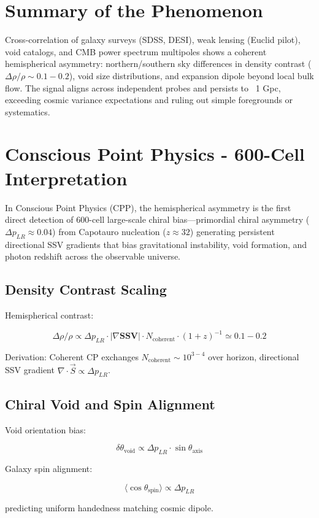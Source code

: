 \documentclass[11pt]{article}
\begin{document}
\section{Summary of the Phenomenon}
Cross-correlation of galaxy surveys (SDSS, DESI), weak lensing (Euclid pilot), void catalogs, and CMB power spectrum multipoles shows a coherent hemispherical asymmetry: northern/southern sky differences in density contrast ($\Delta \rho/\rho \sim 0.1-0.2$), void size distributions, and expansion dipole beyond local bulk flow. The signal aligns across independent probes and persists to ~1 Gpc, exceeding cosmic variance expectations and ruling out simple foregrounds or systematics.

\section{Conscious Point Physics - 600-Cell Interpretation}
In Conscious Point Physics (CPP), the hemispherical asymmetry is the first direct detection of 600-cell large-scale chiral bias—primordial chiral asymmetry ($\Delta p_{LR} \approx 0.04$) from Capotauro nucleation ($z \approx 32$) generating persistent directional SSV gradients that bias gravitational instability, void formation, and photon redshift across the observable universe.

\subsection{Density Contrast Scaling}
Hemispherical contrast:

\[
\Delta \rho / \rho \propto \Delta p_{LR} \cdot |\nabla \mathbf{SSV}| \cdot N_{\text{coherent}} \cdot (1+z)^{-1} \simeq 0.1 - 0.2
\]

Derivation: Coherent CP exchanges $N_{\text{coherent}} \sim 10^{3-4}$ over horizon, directional SSV gradient $\nabla \cdot \vec{S} \propto \Delta p_{LR}$.

\subsection{Chiral Void and Spin Alignment}
Void orientation bias:

\[
\delta \theta_{\text{void}} \propto \Delta p_{LR} \cdot \sin\theta_{\text{axis}}
\]

Galaxy spin alignment:

\[
\langle \cos \theta_{\text{spin}} \rangle \propto \Delta p_{LR}
\]

predicting uniform handedness matching cosmic dipole.
\end{document}
